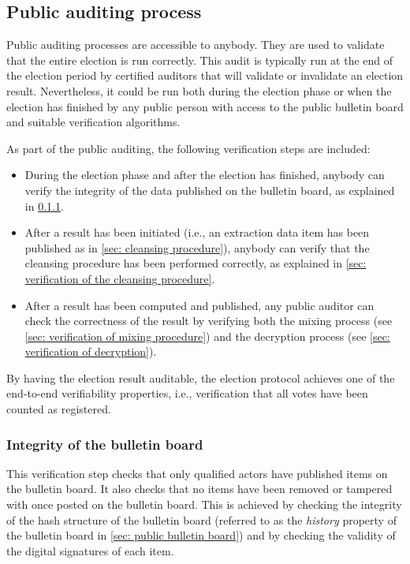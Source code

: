 \subsection{Public auditing process} \label{sec: public auditing process}
Public auditing processes are accessible to anybody. They are used to validate that the entire election is run correctly. This audit is typically run at the end of the election period by certified auditors that will validate or invalidate an election result. Nevertheless, it could be run both during the election phase or when the election has finished by any public person with access to the public bulletin board and suitable verification algorithms.

As part of the public auditing, the following verification steps are included:
\begin{itemize}
    \item During the election phase and after the election has finished, anybody can verify the integrity of the data published on the bulletin board, as explained in \cref{sec: integrity of the bulletin board}.
    \item After a result has been initiated (i.e., an extraction data item has been published as in \cref{sec: cleansing procedure}), anybody can verify that the cleansing procedure has been performed correctly, as explained in \cref{sec: verification of the cleansing procedure}.
    \item After a result has been computed and published, any public auditor can check the correctness of the result by verifying both the mixing process (see \cref{sec: verification of mixing procedure}) and the decryption process (see \cref{sec: verification of decryption}).
\end{itemize}

By having the election result auditable, the election protocol achieves one of the end-to-end verifiability properties, i.e., verification that all votes have been counted as registered.


\subsubsection{Integrity of the bulletin board} \label{sec: integrity of the bulletin board}
This verification step checks that only qualified actors have published items on the bulletin board. It also checks that no items have been removed or tampered with once posted on the bulletin board. This is achieved by checking the integrity of the hash structure of the bulletin board (referred to as the \textit{history} property of the bulletin board in \cref{sec: public bulletin board}) and by checking the validity of the digital signatures of each item.

